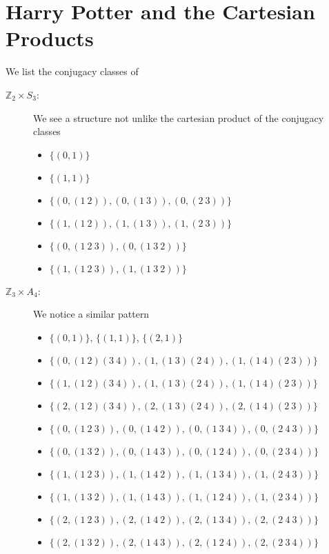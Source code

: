 \documentclass[12pt]{article}
\newcommand*{\Z}{\mathbb{Z}}
\begin{document}
\section{Harry Potter and the Cartesian Products}
We list the conjugacy classes of
\begin{description}
\item[$\Z_2 \times S_3$:] We see a structure not unlike the cartesian product of the conjugacy classes \hfill
\begin{multicols}{2}
\begin{itemize}
\item $\{(0, 1)\}$
\item $\{(1, 1)\}$
\item $\{(0, (1\ 2)),(0, (1\ 3)),(0, (2\ 3))\}$
\item $\{(1, (1\ 2)),(1, (1\ 3)),(1, (2\ 3))\}$
\item $\{(0, (1\ 2\ 3)),(0,(1\ 3\ 2))\}$
\item $\{(1, (1\ 2\ 3)),(1,(1\ 3\ 2))\}$
\end{itemize}
\end{multicols}
\item[$\Z_3 \times A_4$:] We notice a similar pattern\hfill
\begin{itemize}
\item $\{ (0, 1) \}$, $\{ (1, 1) \}$, $\{ (2, 1) \}$
\item $\{ (0, (1\ 2)(3\ 4)), (1, (1\ 3)(2\ 4)), (1, (1\ 4)(2\ 3)) \}$
\item $\{ (1, (1\ 2)(3\ 4)), (1, (1\ 3)(2\ 4)), (1, (1\ 4)(2\ 3)) \}$
\item $\{ (2, (1\ 2)(3\ 4)), (2, (1\ 3)(2\ 4)), (2, (1\ 4)(2\ 3)) \}$
\item $\{ (0, (1\ 2\ 3)), (0, (1\ 4\ 2)), (0, (1\ 3\ 4)), (0, (2\ 4\ 3)) \}$
\item $\{ (0, (1\ 3\ 2)), (0, (1\ 4\ 3)), (0, (1\ 2\ 4)), (0, (2\ 3\ 4)) \}$
\item $\{ (1, (1\ 2\ 3)), (1, (1\ 4\ 2)), (1, (1\ 3\ 4)), (1, (2\ 4\ 3)) \}$
\item $\{ (1, (1\ 3\ 2)), (1, (1\ 4\ 3)), (1, (1\ 2\ 4)), (1, (2\ 3\ 4)) \}$
\item $\{ (2, (1\ 2\ 3)), (2, (1\ 4\ 2)), (2, (1\ 3\ 4)), (2, (2\ 4\ 3)) \}$
\item $\{ (2, (1\ 3\ 2)), (2, (1\ 4\ 3)), (2, (1\ 2\ 4)), (2, (2\ 3\ 4)) \}$
\end{itemize}
\end{description}
\end{document}
